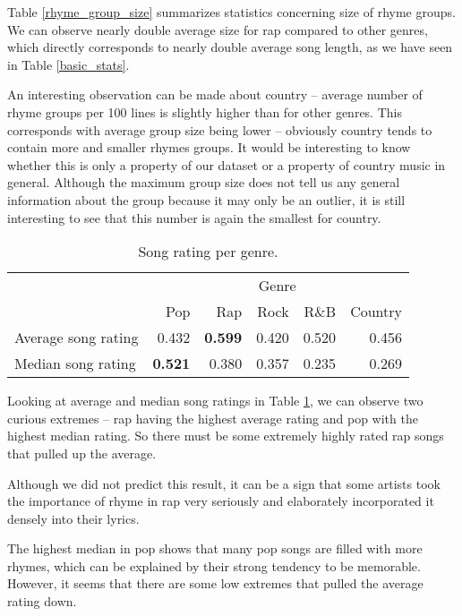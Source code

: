 Table \ref{rhyme_group_size} summarizes statistics concerning size of rhyme groups. We can observe nearly double average size for rap compared to other genres, which directly corresponds to nearly double average song length, as we have seen in Table \ref{basic_stats}. 

An interesting observation can be made about country -- average number of rhyme groups per 100 lines is slightly higher than for other genres. This corresponds with average group size being lower -- obviously country tends to contain more and smaller rhymes groups. It would be interesting to know whether this is only a property of our dataset or a property of country music in general. Although the maximum group size does not tell us any general information about the group because it may only be an outlier, it is still interesting to see that this number is again the smallest for country.

\begin{table}[h!]\centering
\begin{tabular}{l r r r r r}\toprule
                    & \multicolumn{5}{c}{Genre} \\\cmidrule{2-6}
                    & Pop      & Rap      & Rock  &	R\&B  & Country\\\midrule
Average song rating &    0.432 &\bf 0.599 & 0.420 & 0.520 & 0.456 \\
Median song rating  &\bf 0.521 &    0.380 & 0.357 & 0.235 & 0.269 \\\bottomrule
\end{tabular}
\caption{Song rating per genre.} 
\label{song_rating_stats}
\end{table}

Looking at average and median song ratings in Table \ref{song_rating_stats}, we can observe two curious extremes -- rap having the highest average rating and pop with the highest median rating.
So there must be some extremely highly rated rap songs that pulled up the average.

Although we did not predict this result, it can be a sign that some artists took the importance of rhyme in rap very seriously and elaborately incorporated it densely into their lyrics.

The highest median in pop shows that many pop songs are filled with more rhymes, which can be explained by their strong tendency to be memorable. However, it seems that there are some low extremes that pulled the average rating down.
